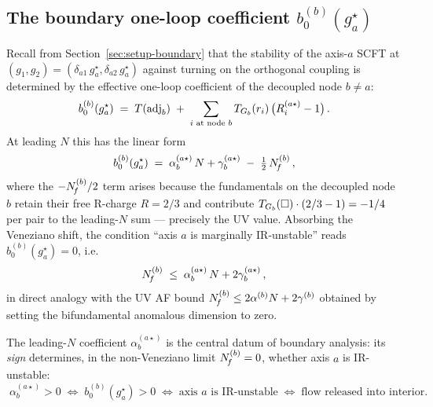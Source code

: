 
\subsection{The boundary one-loop coefficient
  \texorpdfstring{$b_{0}^{(b)}(g_{a}^{\star})$}{b0(b)(ga*)}}
\label{sec:boundary-b0}

Recall from Section~\ref{sec:setup-boundary} that the stability of
the axis-$a$ SCFT at
$(g_{1},g_{2})=(\delta_{a1}\,g_{a}^{\star},\delta_{a2}\,g_{a}^{\star})$
against turning on the orthogonal coupling is determined by the
effective one-loop coefficient of the decoupled node $b\ne a$:
\begin{equation}
  b_{0}^{(b)}(g_{a}^{\star})\;=\;T(\mathrm{adj}_{b})\;+\;\sum_{i\text{ at node }b}
    T_{G_{b}}(r_{i})\,\bigl(R_{i}^{(a\star)}-1\bigr)\,.
  \label{eq:b0-boundary-rep}
\end{equation}
At leading $N$ this has the linear form
\begin{equation}
  b_{0}^{(b)}(g_{a}^{\star})\;=\;\alpha_{b}^{(a\star)}\,N
  +\gamma_{b}^{(a\star)}\;-\;\tfrac{1}{2}\,N_{\!f}^{(b)}\,,
  \label{eq:b0-linear}
\end{equation}
where the $-N_{\!f}^{(b)}/2$ term arises because the fundamentals on
the decoupled node $b$ retain their free R-charge $R=2/3$ and
contribute $T_{G_{b}}(\square)\cdot(2/3-1)=-1/4$ per pair to the
leading-$N$ sum --- precisely the UV value.  Absorbing the Veneziano
shift, the condition ``axis $a$ is marginally IR-unstable'' reads
$b_{0}^{(b)}(g_{a}^{\star})=0$, i.e.
\begin{equation}
  N_{\!f}^{(b)}\;\le\;\alpha_{b}^{(a\star)}\,N
  +2\gamma_{b}^{(a\star)}\,,
  \label{eq:boundary-inequality}
\end{equation}
in direct analogy with the UV AF bound
$N_{\!f}^{(b)}\le 2\alpha^{(b)}N+2\gamma^{(b)}$ obtained by setting the
bifundamental anomalous dimension to zero.

The leading-$N$ coefficient $\alpha_{b}^{(a\star)}$ is the central
datum of boundary analysis: its \emph{sign} determines, in the
non-Veneziano limit $N_{\!f}^{(b)}=0$, whether axis $a$ is IR-unstable:
\begin{equation}
  \boxed{\;
  \alpha_{b}^{(a\star)}>0\;\Longleftrightarrow\;b_{0}^{(b)}(g_{a}^{\star})>0
  \;\Longleftrightarrow\;\text{axis $a$ is IR-unstable}
  \;\Longleftrightarrow\;\text{flow released into interior.}
  }
\end{equation}

